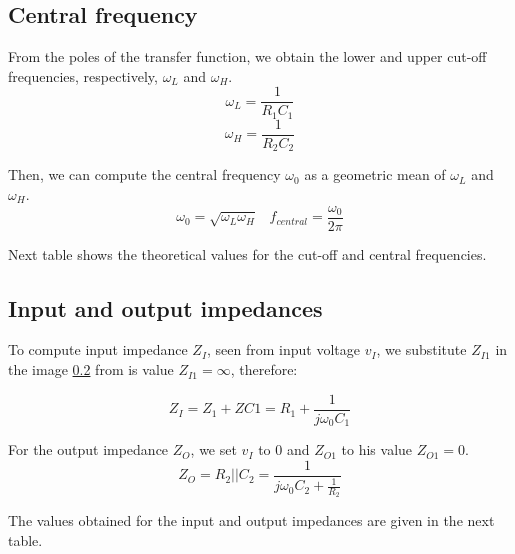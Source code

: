  \subsection{Central frequency}
 \par From the poles of the transfer function, we obtain the lower and upper cut-off frequencies, respectively, $\omega_L$ and $\omega_H$.
 \begin{equation}
 \omega_L=\frac{1}{R_1C_1}
 \end{equation}
 \begin{equation}
 \omega_H=\frac{1}{R_2C_2}
 \end{equation}
 \par Then, we can compute the central frequency $\omega_0$ as a geometric mean of $\omega_L$ and $\omega_H$.
 \begin{equation}
 \omega_0=\sqrt{\omega_L\omega_H} \hspace{10pt} f_{central}=\frac{\omega_0}{2\pi}
 \end{equation}
 
 \par Next table shows the theoretical values for the cut-off and central frequencies.
 
 
 \subsection{Input and output impedances}
 \par To compute input impedance $Z_I$, seen from input voltage $v_I$, we substitute $Z_{I1}$ in the image \ref{} from is value $Z_{I1}=\infty$, therefore:
 
 \begin{equation}
 Z_I=Z_1+Z{C1}=R_1+\frac{1}{j\omega_0C_1}
 \end{equation}
\par For the output impedance $Z_{O}$, we set $v_I$ to $0$ and $Z_{O1}$ to his value $Z_{O1}=0$.
\begin{equation}
Z_O=R_2||C_2=\frac{1}{j\omega_0C_2+\frac{1}{R_2}}
\end{equation}

\par The values obtained for the input and output impedances are given in the next table.



  
 


 
 
